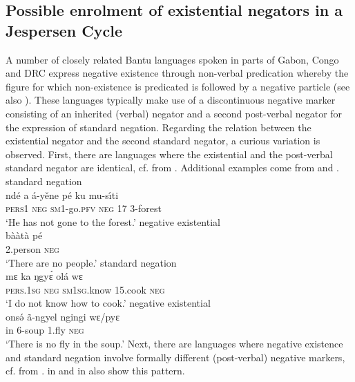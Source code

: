 \documentclass[output=paper]{langscibook}
\begin{document}
\subsection{Possible enrolment of existential negators in a Jespersen Cycle}\label{sec:1:6.3}
%
A number of closely related Bantu languages spoken in parts of Gabon, Congo and DRC express negative existence through non-verbal predication whereby the figure for which non-existence is predicated is followed by a negative particle (see also ). These languages typically make use of a discontinuous negative marker consisting of an inherited (verbal) negator and a second post-verbal negator for the expression of standard negation. Regarding the relation between the existential negator and the second standard negator, a curious variation is observed. First, there are languages where the existential and the post-verbal standard negator are identical, cf.  from . Additional examples come from   and  .
%
\ea\label{ex:iyaa-forest-people}
%
\ea standard negation\\
\gll nd\'e a {\'a}-yěne p\'e ku mu-s{\'\i}ti\\
	\textsc{pers}1 \textsc{neg} \textsc{sm}1-go.\textsc{pfv} \textsc{neg} 17 3-forest\\
\glt 	`He has not gone to the forest.'
\ex negative existential\\
\gll b{\`a\`a}t\`a p\'e\\
	2.person \textsc{neg}\\
\glt 	`There are no people.'
\z\z
%
\ea\label{ex:engungwel-cook-fly}
%
\ea standard negation\\
\gll mɛ ka ŋgy\'ɛ ol\'a wɛ\\
	\textsc{pers.1sg} \textsc{neg} \textsc{sm1sg}.know 15.cook \textsc{neg}\\
\glt 	`I do not know how to cook.'
%
\ex negative existential\\
\gll ons\'ə {\~a}-ngyel ngingi wɛ/pyɛ\footnotemark\\
	in 6-soup 1.fly \textsc{neg}\\
\glt 	`There is no fly in the soup.'
\z\z
%
Next, there are languages where negative existence and standard negation involve formally different (post-verbal) negative markers, cf.  from .  in  and  in  also show this pattern.
\end{document}
